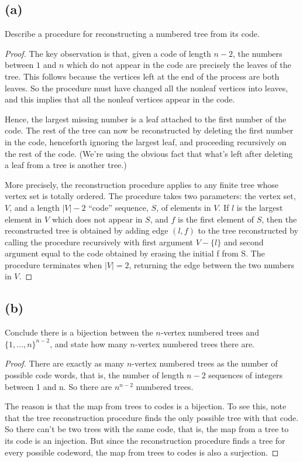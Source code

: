 \documentclass[14pt]{extarticle}
\begin{document}
\subsection{(a)}
Describe a procedure for reconstructing a numbered tree from its code.
\begin{proof}
The key observation is that, given a code of length $n - 2$, the numbers between $1$ and $n$ which do not appear in the code are precisely the leaves of the tree. This follows because the vertices
left at the end of the process are both leaves. So the procedure must have changed all the nonleaf vertices into leaves, and this implies that all the nonleaf vertices appear in the code.

Hence, the largest missing number is a leaf attached to the first number of the code. The rest of the tree can now be reconstructed by deleting the first number in the code, henceforth ignoring the largest leaf, and proceeding recursively on the rest of the code. (We’re using the obvious fact that what’s left after deleting a leaf from a tree is another tree.)

More precisely, the reconstruction procedure applies to any finite tree whose vertex set is totally ordered. The procedure takes two parameters: the vertex set, $V$, and a length $|V| - 2$ “code”
sequence, $S$, of elements in $V$. If $l$ is the largest element in $V$ which does not appear in $S$, and $f$ is the first element of $S$, then the reconstructed tree is obtained by adding edge $(l, f)$ to the tree reconstructed by calling the procedure recursively with first argument $V - \{l\}$ and second argument equal to the code obtained by erasing the initial f from S. The procedure terminates when $|V| = 2$, returning the edge between the two numbers in $V$.
\end{proof}

\subsection{(b)}
Conclude there is a bijection between the $n$-vertex numbered trees and $\{1, \ldots, n\}^{n-2}$, and state how many $n$-vertex numbered trees there are.
\begin{proof}
There are exactly as many $n$-vertex numbered trees as the number of possible code words, that is, the number of length $n - 2$ sequences of integers between 1 and n. So there are $n^{n-2}$ numbered trees.

The reason is that the map from trees to codes is a bijection. To see this, note that the tree re­construction procedure finds the only possible tree with that code. So there can’t be two trees with
the same code, that is, the map from a tree to its code is an injection. But since the reconstruc­tion procedure finds a tree for every possible codeword, the map from trees to codes is also a
surjection.
\end{proof}
\end{document}
